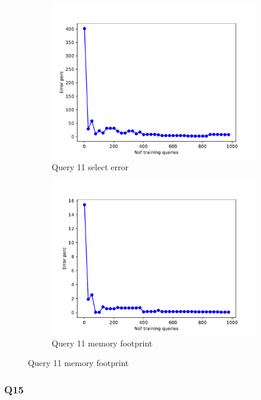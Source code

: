 \begin{figure}[htb!]
 \begin{subfigure}[t]{0.5\textwidth}
   \includegraphics[scale=0.4]{figs/airtraffic/airtraffic_sel11_error.pdf}
   \caption{Query 11 select error}
   \label{fig:sel11}
 \end{subfigure}
 \begin{subfigure}[t]{0.5\textwidth}
   \includegraphics[scale=0.4]{figs/airtraffic/airtraffic_q11_memerror.pdf}
   \caption{Query 11 memory footprint}
   \label{fig:mem11}
  \end{subfigure}

\end{figure}


\subsubsection{Q15}

